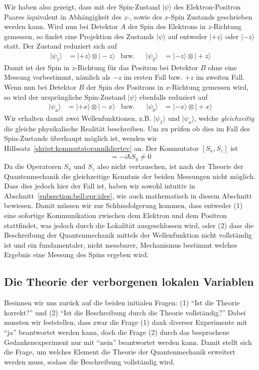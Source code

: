 \begin{refsection}
Wir haben also gezeigt, dass mit der Spin-Zustand $|\psi\rangle$ des
Elektron-Positron Paares \"aquivalent in Abh\"angigkeit des $z$-, sowie
des $x$-Spin Zustands geschrieben werden kann.
Wird nun bei Detektor $A$ der Spin des Elektrons in $z$-Richtung gemessen, 
so findet eine Projektion des Zustands $|\psi\rangle$ auf entweder
$|{+}z\rangle$ oder $|{-}z\rangle$ statt.
Der Zustand reduziert sich auf
\begin{align*}
    |\psi_{1}\rangle &= |{+}z\rangle \otimes |{-}z\rangle
    & \text{bzw.} && 
    |\psi_{2}\rangle &= |{-}z\rangle \otimes |{+}z\rangle
\end{align*}
Damit ist der Spin in $z$-Richtung f\"ur das Positron bei Detektor $B$ ohne
eine Messung vorbestimmt, n\"amlich als $-z$ im ersten Fall bzw. $+z$ im
zweiten Fall.
Wenn nun bei Detektor $B$ der Spin des Positrons in $x$-Richtung gemessen
wird, so wird der urspr\"ungliche Spin-Zustand $|\psi\rangle$
ebenfalls reduziert auf
\begin{align*}
    |\psi_{a}\rangle &= |{+}x\rangle \otimes |{-}x\rangle
    & \text{bzw.} && 
    |\psi_{b}\rangle &= |{-}x\rangle \otimes |{+}x\rangle
\end{align*}
Wir erhalten damit zwei Wellenfunktionen, z.B. $|\psi_{1}\rangle$ und 
$|\psi_{a}\rangle$, welche \emph{gleichzeitig} die gleiche 
physikalische Realit\"at beschreiben.
Um zu pr\"ufen ob dies im Fall des Spin-Zustands \"uberhaupt m\"oglich 
ist, wenden wir Hilfssatz~\ref{skript:kommutatorannihliertev} an.
Der Kommutator $[S_x,S_z]$ ist
\begin{equation}
    [S_x, S_z] =  -i \hbar S_y \neq 0
\end{equation}
Da die Operatoren $S_x$ und $S_z$ also nicht vertauschen, ist nach der Theorie
der Quantenmechanik die gleichzeitige Kenntnis der beiden Messungen nicht
m\"oglich.
Dass dies jedoch hier der Fall ist, haben wir sowohl intuitiv in
Abschnitt~\ref{subsection:bell:epr:idee}, wie auch mathematisch in
diesem Abschnitt bewiesen. 
Damit m\"ussen wir zur Schlussfolgerung kommen, dass entweder 
(1) eine sofortige Kommunikation zwischen dem Elektron und dem Positron
stattfindet, was  jedoch durch die Lokalit\"at ausgeschlossen wird,
oder (2) dass die Beschreibung der Quantenmechanik mittels der Wellenfunktion
nicht  vollst\"andig ist und ein fundamentaler, nicht messbarer, Mechanismus
bestimmt welches Ergebnis eine Messung des Spins ergeben wird.


\subsection{Die Theorie der verborgenen lokalen Variablen}
Besinnen wir uns zur\"uck auf die beiden initialen Fragen: 
(1) \enquote{Ist die Theorie korrekt?} und 
(2) \enquote{Ist die Beschreibung durch die Theorie vollst\"andig?}
Dabei mussten wir feststellen, dass zwar die Frage (1) dank diverser
Experimente mit \enquote{ja} beantwortet werden kann, doch die Frage (2) 
durch das besprochene Gedankenexperiment nur mit \enquote{nein} beantwortet
werden kann. 
Damit stellt sich die Frage, um welches Element die Theorie der Quantenmechanik
erweitert werden muss, sodass die Beschreibung vollst\"andig wird.


\end{refsection}

